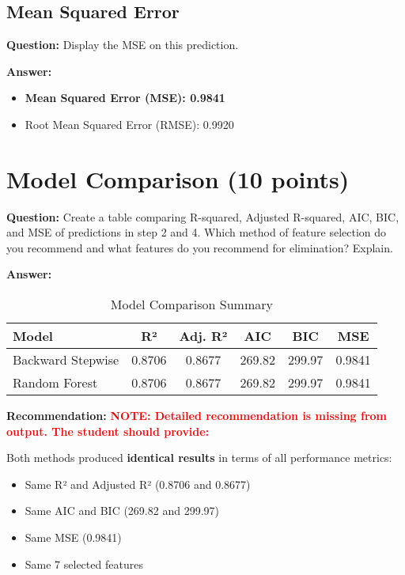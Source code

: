 \documentclass[11pt]{article}
\begin{document}
\subsection{Mean Squared Error}

\textbf{Question:} Display the MSE on this prediction.

\textbf{Answer:}
\begin{itemize}
    \item \textbf{Mean Squared Error (MSE): 0.9841}
    \item Root Mean Squared Error (RMSE): 0.9920
\end{itemize}

\section{Model Comparison (10 points)}

\textbf{Question:} Create a table comparing R-squared, Adjusted R-squared, AIC, BIC, and MSE of predictions in step 2 and 4. Which method of feature selection do you recommend and what features do you recommend for elimination? Explain.

\textbf{Answer:}

\begin{table}[H]
\centering
\caption{Model Comparison Summary}
\begin{tabular}{lccccc}
\toprule
\textbf{Model} & \textbf{R²} & \textbf{Adj. R²} & \textbf{AIC} & \textbf{BIC} & \textbf{MSE} \\
\midrule
Backward Stepwise & 0.8706 & 0.8677 & 269.82 & 299.97 & 0.9841 \\
Random Forest & 0.8706 & 0.8677 & 269.82 & 299.97 & 0.9841 \\
\bottomrule
\end{tabular}
\end{table}

\textbf{Recommendation:} \textcolor{red}{\textbf{NOTE: Detailed recommendation is missing from output. The student should provide:}}

Both methods produced \textbf{identical results} in terms of all performance metrics:
\begin{itemize}
    \item Same R² and Adjusted R² (0.8706 and 0.8677)
    \item Same AIC and BIC (269.82 and 299.97)
    \item Same MSE (0.9841)
    \item Same 7 selected features
\end{itemize}
\end{document}
